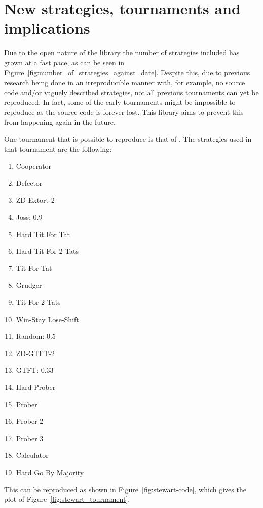 \documentclass{article}
\begin{document}
\section{New strategies, tournaments and implications}\label{sec:new-strategies-and-implications}

Due to the open nature of the library the number of strategies included has
grown at a fast pace, as can be seen in
Figure~\ref{fig:number_of_strategies_against_date}. Despite this, due to
previous research being done in an irreproducible manner with, for example, no
source code and/or vaguely described strategies, not all previous tournaments
can yet be reproduced. In fact, some of the early tournaments might be
impossible to reproduce as the source code is forever lost. This library aims
to prevent this from happening again in the future.

One tournament that is possible to reproduce is that of
\cite{Stewart2012}. The strategies used in that tournament are the following:

\begin{enumerate}
    \item Cooperator
    \item Defector
    \item ZD-Extort-2
    \item Joss: 0.9
    \item Hard Tit For Tat
    \item Hard Tit For 2 Tats
    \item Tit For Tat
    \item Grudger
    \item Tit For 2 Tats
    \item Win-Stay Lose-Shift
    \item Random: 0.5
    \item ZD-GTFT-2
    \item GTFT: 0.33
    \item Hard Prober
    \item Prober
    \item Prober 2
    \item Prober 3
    \item Calculator
    \item Hard Go By Majority
\end{enumerate}

This can be reproduced as shown in Figure~\ref{fig:stewart-code}, which gives
the plot of Figure~\ref{fig:stewart_tournament}.
\end{document}
